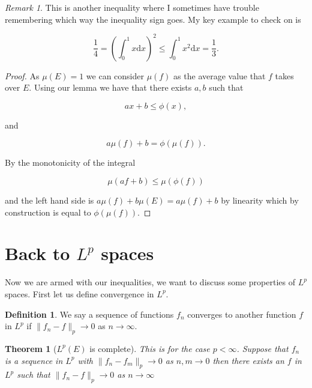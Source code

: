 \documentclass[
]{book}
\newtheorem{theorem}{Theorem}[chapter]
\theoremstyle{definition}
\newtheorem{definition}{Definition}[chapter]
\theoremstyle{definition}
\theoremstyle{definition}
\theoremstyle{definition}
\theoremstyle{remark}
\newtheorem*{remark}{Remark}
\begin{document}
\begin{remark}
This is another inequality where I sometimes have trouble remembering which way the inequality sign goes. My key example to check on is

\[\frac{1}{4} = \left( \int_0^1 x \mathrm{d}x \right)^2 \leq \int_0^1 x^2 \mathrm{d}x = \frac{1}{3}. \]
\end{remark}

\begin{proof}
As \(\mu(E)=1\) we can consider \(\mu(f)\) as the average value that \(f\) takes over \(E\). Using our lemma we have that there exists \(a,b\) such that

\[ ax+b \leq \phi(x), \]

and

\[a\mu(f)+b = \phi(\mu(f)).\]

By the monotonicity of the integral

\[ \mu(af + b) \leq \mu(\phi(f)) \]

and the left hand side is \(a \mu(f) +b \mu(E)= a \mu(f) +b\) by linearity which by construction is equal to \(\phi(\mu(f))\).
\end{proof}

\hypertarget{back-to-lp-spaces}{%
\section{\texorpdfstring{Back to \(L^p\) spaces}{Back to L\^{}p spaces}}\label{back-to-lp-spaces}}

Now we are armed with our inequalities, we want to discuss some properties of \(L^p\) spaces. First let us define convergence in \(L^p\).

\begin{definition}
We say a sequence of functions \(f_n\) converges to another function \(f\) in \(L^p\) if \(\|f_n -f\|_p \rightarrow 0\) as \(n \rightarrow \infty\).
\end{definition}

\begin{theorem}[$L^p(E)$ is complete]
This is for the case \(p<\infty\).
Suppose that \(f_n\) is a sequence in \(L^p\) with \(\|f_n - f_m\|_p \rightarrow 0\) as \(n,m \rightarrow 0\) then there exists an \(f\) in \(L^p\) such that \(\|f_n -f\|_p \rightarrow 0\) as \(n \rightarrow \infty\)
\end{theorem}
\end{document}
